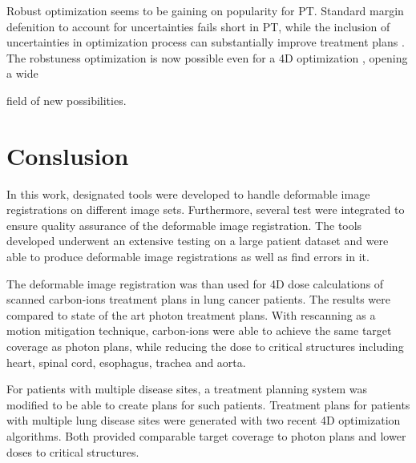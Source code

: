 \documentclass[type=dr, dr=rernat, accentcolor=tud7b,colorbacktitle, bigchapter, openright, twoside, 12pt ]{tudthesis}
\begin{document}
Robust optimization seems to be gaining on popularity for PT. Standard margin defenition to account for uncertainties fails short in PT, while the inclusion of uncertainties in 
optimization process can substantially improve treatment plans \cite{Chen2012}. The robstuness optimization is now possible even for a 4D optimization \cite{Liu2016}, opening a wide

field of new possibilities. 
\newpage

\chapter{Conslusion}

In this work, designated tools were developed to handle deformable image registrations on different image sets. Furthermore, several test were 
integrated to ensure quality assurance of the deformable image registration. The tools developed underwent an extensive testing on a large patient dataset
and were able to produce deformable image registrations as well as find errors in it.

The deformable image registration was than used for 4D dose calculations of scanned carbon-ions treatment plans in lung cancer patients. The results were compared
to state of the art photon treatment plans. With rescanning as a motion mitigation technique, carbon-ions were able to achieve the same target coverage as
photon plans, while reducing the dose to critical structures including heart, spinal cord, esophagus, trachea and aorta.

For patients with multiple disease sites, a treatment planning system was modified to be able to create plans for such patients. 
Treatment plans for patients with multiple lung disease sites were generated with two recent 4D optimization algorithms. Both provided
comparable target coverage to photon plans and lower doses to critical structures.
% 
% 
% 
% 
% 
% 
% 
% 
% 
% 
% 
% 
% 
% 
% 
% 


{}
% 
\end{document}
